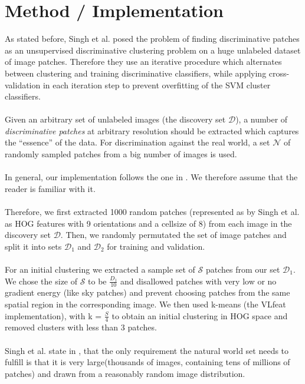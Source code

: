 \section{Method / Implementation}

As stated before, Singh et al. posed the problem of finding discriminative patches as an unsupervised 
discriminative clustering problem on a huge unlabeled dataset of image patches. Therefore they use
an iterative procedure which alternates between clustering and training discriminative classifiers, while
applying cross-validation in each iteration step to prevent overfitting of the SVM cluster classifiers.\\
\\
Given an arbitrary set of unlabeled images (the discovery set $\mathcal{D}$), a number of \textit{discriminative patches}
at arbitrary resolution should be extracted which captures the ``essence'' of the data. For discrimination against
the real world, a set $\mathcal{N}$ of randomly sampled patches from a big number of images is used.\\
\\
In general, our implementation 
follows the one in \cite{Singh2012DiscPat}. We therefore assume that the reader is familiar with it.\\
\\
Therefore, we first extracted 1000 random patches (represented as by Singh et al. as HOG features with 9 orientations
and a cellsize of 8) from each image in the discovery set $\mathcal{D}$. Then, we randomly permutated
the set of image patches and split it into sets $\mathcal{D}_1$ and $\mathcal{D}_2$ for training and validation. \\
\\
For an initial clustering we extracted a sample set of $\mathcal{S}$ patches from our set $\mathcal{D_1}$. We chose the size
of $\mathcal{S}$ to be $\frac{D_1}{10}$ and disallowed patches with very low or no gradient energy (like sky patches) and prevent choosing patches from the same spatial region in the corresponding image.
We then used k-means (the VLfeat implementation), with k = $\frac{S}{4}$ to obtain an initial clustering in HOG space and removed
clusters with less than 3 patches.\\
\\
Singh et al. state in \cite{Singh2012DiscPat}, that the only requirement the natural world set needs to fulfill is that
it is very large(thousands of images, containing tens of millions of patches) and drawn from a reasonably random image distribution.
